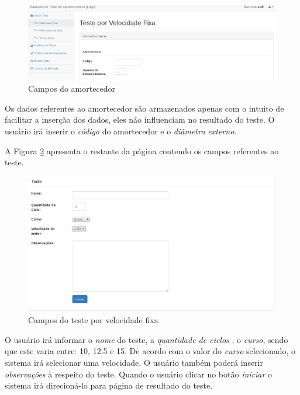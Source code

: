 \begin{figure}[h]
	\centering
	\label{img:teste_fixo_um}
		\includegraphics[width=1\textwidth]{figuras/dados_amortecedor.eps}
	\caption{Campos do amortecedor}
\end{figure}

Os dados referentes ao amortecedor são armazenados apenas com o intuito de facilitar a inserção dos dados, eles não influenciam no resultado do teste. O usuário irá inserir o \textit{código} do amortecedor e o \textit{diâmetro externo}. 

A Figura \ref{img:teste_fixo_dois} apresenta o restante da página contendo os campos referentes ao teste. 

\begin{figure}[h]
	\centering
	\label{img:teste_fixo_dois}
		\includegraphics[width=1\textwidth]{figuras/dados_teste_fixo.eps}
	\caption{Campos do teste por velocidade fixa}
\end{figure}

O usuário irá informar o \textit{nome} do teste, a \textit{quantidade de ciclos }, o \textit{curso}, sendo que este varia entre: 10, 12.5 e 15. De acordo com o valor do \textit{curso} selecionado, o sistema irá selecionar uma velocidade. O usuário também poderá inserir \textit{observações} à respeito do teste. Quando o usuário clicar no botão \textit{iniciar} o sistema irá direcioná-lo para página de resultado do teste. 

